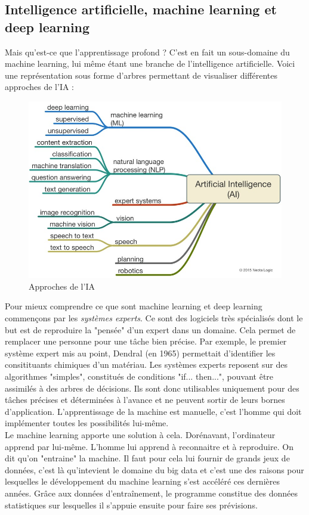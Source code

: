 \subsection{Intelligence artificielle, machine learning et deep learning}
	Mais qu'est-ce que l'apprentissage profond ? C'est en fait un sous-domaine du machine learning, lui même étant une branche de l'intelligence artificielle. Voici une représentation sous forme d'arbres permettant de visualiser différentes approches de l'IA : 
	\begin{figure}[H]
		\centering\includegraphics[width=0.7\linewidth]{images/branches}
		\caption{Approches de l'IA}
	\end{figure}
	Pour mieux comprendre ce que sont machine learning et deep learning commençons par les \textit{systèmes experts}. Ce sont des logiciels très spécialisés dont le but est de reproduire la "pensée" d'un expert dans un domaine. Cela permet de remplacer une personne pour une tâche bien précise. Par exemple, le premier système expert mis au point, Dendral (en 1965) permettait d'identifier les consitituants chimiques d'un matériau. Les systèmes experts reposent sur des algorithmes "simples", constitués de conditions "if... then...", pouvant être assimilés à des arbres de décisions. Ils sont donc utilisables uniquement pour des tâches précises et déterminées à l'avance et ne peuvent sortir de leurs bornes d'application. L'apprentissage de la machine est manuelle, c'est l'homme qui doit implémenter toutes les possibilités lui-même.\\
	
	Le machine learning apporte une solution à cela. Dorénavant, l'ordinateur apprend par lui-même. L'homme lui apprend à reconnaitre et à reproduire. On dit qu'on "entraine" la machine. Il faut pour cela lui fournir de grands jeux de données, c'est là qu'intevient le domaine du big data et c'est une des raisons pour lesquelles le développement du machine learning s'est accéléré ces dernières années. Grâce aux données d'entraînement, le programme constitue des données statistiques sur lesquelles il s'appuie ensuite pour faire ses prévisions. \\
	

